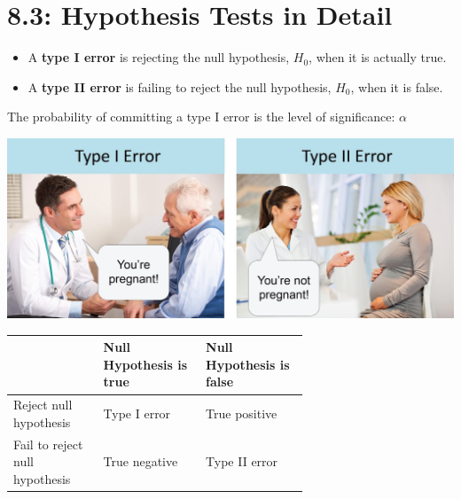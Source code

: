 \documentclass[../mathNotesPreamble]{subfiles}
\begin{document}
  \section{8.3: Hypothesis Tests in Detail}
    \begin{defn*}
      \begin{itemize}
        \item A \textbf{type I error} is rejecting the null hypothesis, $H_0$, when it is actually true.
        \item A \textbf{type II error} is failing to reject the null hypothesis, $H_0$, when it is false.
      \end{itemize}
      The probability of committing a type I error is the level of significance: $\alpha$
    \end{defn*}
    
    \begin{center}
      \href{https://www.reddit.com/r/Mcat/comments/ao6ovi/type_i_and_type_ii_errors/}{\includegraphics[width=0.85\linewidth]{images/Type_I_and_II_error.jpg}}

      \renewcommand{\arraystretch}{1.5}
      \begin{tabularx}{0.66\linewidth}{*{3}{@{}M{0.22\linewidth}@{}}}\toprule
        & Null Hypothesis \newline is true& Null Hypothesis \newline is false\\\midrule
        Reject null hypothesis& Type I error& True positive\\
        Fail to reject null hypothesis& True negative & Type II error\\\bottomrule
      \end{tabularx}
    \end{center}
  \pagebreak
  
\end{document}
